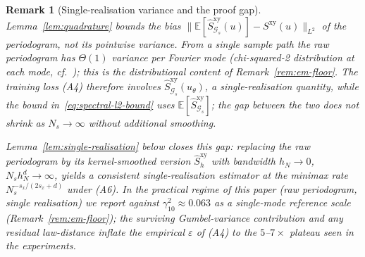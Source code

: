 \documentclass[review,12pt]{elsarticle}
\newtheorem{remark}{Remark}
\begin{document}
\begin{remark}[Single-realisation variance and the proof gap]
\label{rem:periodogram-variance}
Lemma~\ref{lem:quadrature} bounds the \emph{bias}
\(\|\mathbb E[\widehat S^{\mathrm{xy}}_{\mathcal G_s}(u)]
- S^{\mathrm{xy}}(u)\|_{L^2}\) of the periodogram, not its
pointwise variance. From a single sample path the raw periodogram
has \(\Theta(1)\) variance per Fourier mode (chi-squared-2
distribution at each mode, cf.~\cite[Ch.~4]{Brillinger1981}); this
is the distributional content of Remark~\ref{rem:em-floor}. The
training loss (A4) therefore involves
\(\widehat S^{\mathrm{xy}}_{\mathcal G_s}(u_\theta)\), a
single-realisation quantity, while the bound
in~\eqref{eq:spectral-l2-bound} uses
\(\mathbb E[\widehat S^{\mathrm{xy}}_{\mathcal G_s}]\); the gap
between the two does not shrink as \(N_s \to \infty\) without
additional smoothing.

Lemma~\ref{lem:single-realisation} below closes this gap: replacing
the raw periodogram by its kernel-smoothed version
\(\widehat S^{\mathrm{xy}}_h\) with bandwidth \(h_N \to 0\),
\(N_s h_N^d \to \infty\), yields a consistent single-realisation
estimator at the minimax rate \(N_s^{-s_x/(2s_x+d)}\) under (A6).
In the practical regime of this paper (raw periodogram, single
realisation) we report against \(\gamma_{10}^2 \approx 0.063\) as
a single-mode reference scale (Remark~\ref{rem:em-floor}); the
surviving Gumbel-variance contribution and any residual law-distance
inflate the empirical \(\varepsilon\) of (A4) to the
\(5\)--\(7\times\) plateau seen in the experiments.
\end{remark}
\end{document}
